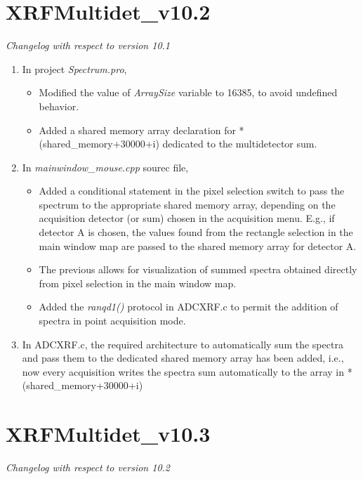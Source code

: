 \documentclass[a4paper,12pt]{article}
\begin{document}
\section{XRFMultidet\_v10.2}
\textit{Changelog with respect to version 10.1}

\begin{enumerate}
	\item In project \textit{Spectrum.pro},
	\begin{itemize}
		\item Modified the value of \textit{ArraySize} variable to 16385, to avoid undefined behavior.
		\item Added a shared memory array declaration for *(shared\_memory+30000+i) dedicated to the multidetector sum.
	\end{itemize}
	\item In \textit{mainwindow\_mouse.cpp} sourec file,
	\begin{itemize}
		\item Added a conditional statement in the pixel selection switch to pass the spectrum to the appropriate shared memory array, depending on the acquisition detector (or sum) chosen in the acquisition menu. E.g., if detector A is chosen, the values found from the rectangle selection in the main window map are passed to the shared memory array for detector A.
		\item The previous allows for visualization of summed spectra obtained directly from pixel selection in the main window map.
		\item Added the \textit{ranqd1()} protocol in ADCXRF.c to permit the addition of spectra in point acquisition mode.
	\end{itemize}
	\item In ADCXRF.c, the required architecture to automatically sum the spectra and pass them to the dedicated shared memory array has been added, i.e., now every acquisition writes the spectra sum automatically to the array in *(shared\_memory+30000+i)
\end{enumerate}

\section{XRFMultidet\_v10.3}
\textit{Changelog with respect to version 10.2}
\end{document}
